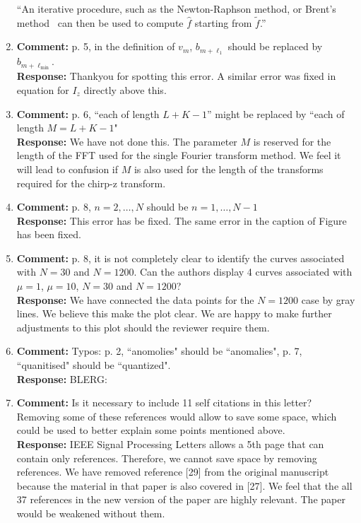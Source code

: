 \documentclass[a4paper,10pt]{article}
\begin{document}
\begin{enumerate}
``An iterative procedure, such as the Newton-Raphson method, or Brent's method~\cite{Brent_opt_no_derivs_1973} 
can then be used to compute $\hat{f}$ starting from $\widetilde{f}$.''



\item\textbf{Comment:}
p. 5, in the definition of $v_m$, $b_{m+\ell_1}$ should be replaced by $b_{m+\ell_{\text{min}}}$.
\\
\textbf{Response:}
Thankyou for spotting this error.  A similar error was fixed in equation for $I_z$ directly above this. 


\item\textbf{Comment:}
p. 6, ``each of length $L+K-1$'' might be replaced by ``each of length $M = L + K - 1$"
\\
\textbf{Response:}
We have not done this.  The parameter $M$ is reserved for the length of the FFT used for the single Fourier transform method.  We feel it will lead to confusion if $M$ is also used for the length of the transforms required for the chirp-z transform.


\item\textbf{Comment:}
p. 8, $n = 2,\dots,N$ should be $n = 1, \dots, N - 1$
\\
\textbf{Response:}
This error has be fixed.  The same error in the caption of Figure~ has been fixed.


\item\textbf{Comment:}
p. 8, it is not completely clear to identify the curves associated with $N = 30$ and $N = 1200$. Can the authors display 4 curves associated with $\mu= 1$, $\mu = 10$, $N = 30$ and $N = 1200$?
\\
\textbf{Response:}
We have connected the data points for the $N=1200$ case by gray lines.  We believe this make the plot clear.  We are happy to make further adjustments to this plot should the reviewer require them. 

\item\textbf{Comment:}
Typos: p. 2, “anomolies" should be “anomalies", p. 7, “quanitised" should be
“quantized".
\\
\textbf{Response:}
BLERG: 


\item\textbf{Comment:}
Is it necessary to include 11 self citations in this letter? Removing some of
these references would allow to save some space, which could be used to better
explain some points mentioned above.
\\
\textbf{Response:}
IEEE Signal Processing Letters allows a 5th page that can contain only references.  Therefore, we cannot save space by removing references.   We have removed reference [29] from the original manuscript because the material in that paper is also covered in [27].  We feel that the all 37 references in the new version of the paper are highly relevant.  The paper would be weakened without them.

\end{enumerate}
\end{document}
